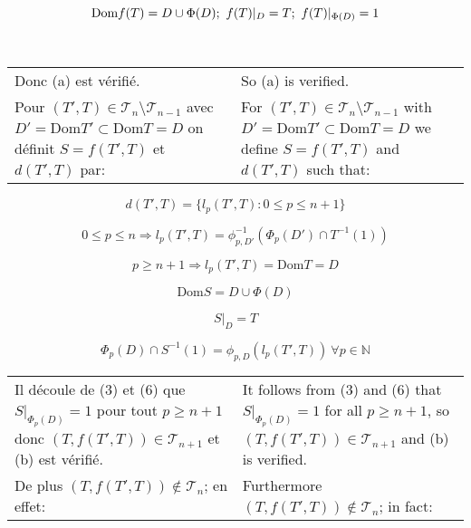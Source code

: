 \documentclass[12pt]{article}
\theoremstyle{plain}
\theoremstyle{definition}
\theoremstyle{remark}
\begin{document}
\[
\textrm{Dom}f(T) = D \cup \Phi(D); \textrm{\space} f(T)|_D=T; \textrm{\space}  f(T)|_{\Phi(D)} = 1
\]

\

\begin{tabular}{p{2.8in} p{2.8in}}

Donc (a) est v\'erifi\'e.

&

So (a) is verified.

\\

Pour $(T',T)\in \mathcal{T}_n\setminus\mathcal{T}_{n-1}$ avec $D' = \textrm{Dom}T' \subset \textrm{Dom} T = D$ on d\'efinit $S = f(T',T)$ et $d(T',T)$ par:

&

For $(T',T)\in \mathcal{T}_n\setminus\mathcal{T}_{n-1}$ with $D' = \textrm{Dom}T' \subset \textrm{Dom} T = D$ we define $S = f(T',T)$ and $d(T',T)$ such that:

\end{tabular}

\setcounter{equation}{0}
\begin{equation}
d(T',T) = \{l_p(T',T) : 0 \leq p \leq n+1\}
\end{equation}

\begin{equation}
0\leq p \leq n \Rightarrow l_p(T',T) = \phi^{-1}_{p,D'}(\Phi_p(D') \cap T^{-1}(1))
\end{equation}

\begin{equation}
p \geq n+1 \Rightarrow l_p(T',T) = \textrm{Dom}T = D
\end{equation}

\begin{equation}
\textrm{Dom} S = D \cup \Phi(D)
\end{equation}

\begin{equation}
S|_D = T
\end{equation}

\begin{equation}
\Phi_p(D) \cap S^{-1}(1) = \phi_{p,D}(l_p(T',T)) \ \forall p \in \mathbb{N}
\end{equation}

\begin{tabular}{p{2.8in} p{2.8in}}

Il d\'ecoule de (3) et (6) que $S|_{\Phi_p(D)} = 1$ pour tout $p \geq n+1$ donc $(T,f(T',T)) \in \mathcal{T}_{n+1}$ et (b) est v\'erifi\'e.

&

It follows from (3) and (6) that $S|_{\Phi_p(D)} = 1$ for all $p \geq n+1$, so $(T,f(T',T)) \in \mathcal{T}_{n+1}$ and (b) is verified.

\\

De plus $(T,f(T',T)) \not\in \mathcal{T}_n$; en effet:

&

Furthermore $(T,f(T',T)) \not\in \mathcal{T}_n$; in fact:

\end{tabular}
\end{document}
